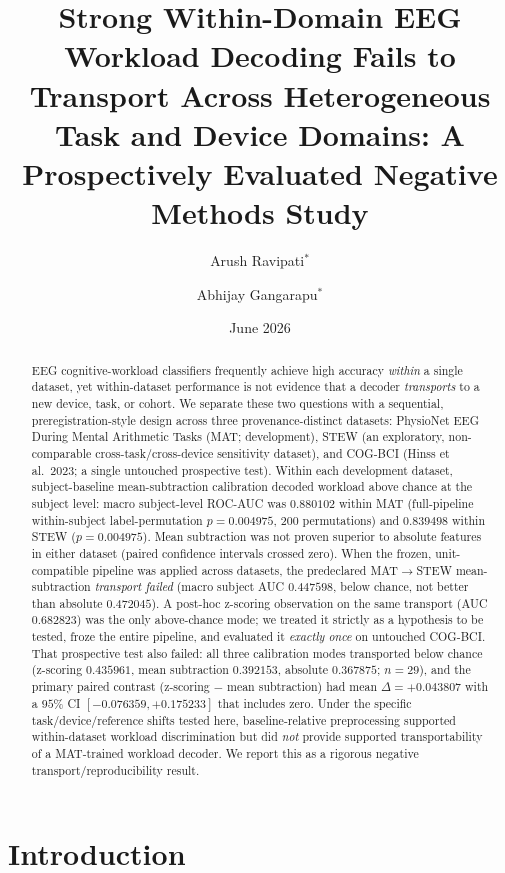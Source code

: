 \documentclass[11pt]{article}
\title{\textbf{Strong Within-Domain EEG Workload Decoding Fails to Transport
Across Heterogeneous Task and Device Domains: A Prospectively Evaluated
Negative Methods Study}}
\author[1]{Arush Ravipati$^{\ast}$}
\author[1]{Abhijay Gangarapu$^{\ast}$}
\affil[1]{Independent Researcher}
\date{June 2026}
\begin{document}
\maketitle
\begingroup
\renewcommand{\thefootnote}{}
\endgroup

\begin{abstract}
EEG cognitive-workload classifiers frequently achieve high accuracy
\textit{within} a single dataset, yet within-dataset performance is not
evidence that a decoder \textit{transports} to a new device, task, or cohort.
We separate these two questions with a sequential, preregistration-style design
across three provenance-distinct datasets: PhysioNet EEG During Mental
Arithmetic Tasks (MAT; development), STEW (an exploratory, non-comparable
cross-task/cross-device sensitivity dataset), and COG-BCI (Hinss et al.\ 2023;
a single untouched prospective test). Within each development dataset,
subject-baseline mean-subtraction calibration decoded workload above chance at
the subject level: macro subject-level ROC-AUC was $0.880102$ within MAT
(full-pipeline within-subject label-permutation $p = 0.004975$, 200
permutations) and $0.839498$ within STEW ($p = 0.004975$). Mean subtraction was
not proven superior to absolute features in either dataset (paired confidence
intervals crossed zero). When the frozen, unit-compatible pipeline was applied
across datasets, the predeclared MAT$\rightarrow$STEW mean-subtraction
\textit{transport failed} (macro subject AUC $0.447598$, below chance, not
better than absolute $0.472045$). A post-hoc z-scoring observation on the same
transport (AUC $0.682823$) was the only above-chance mode; we treated it strictly
as a hypothesis to be tested, froze the entire pipeline, and evaluated it
\textit{exactly once} on untouched COG-BCI. That prospective test also failed:
all three calibration modes transported below chance (z-scoring $0.435961$, mean
subtraction $0.392153$, absolute $0.367875$; $n = 29$), and the primary paired
contrast (z-scoring $-$ mean subtraction) had mean $\Delta = +0.043807$ with a
$95\%$ CI $[-0.076359, +0.175233]$ that includes zero. Under the specific
task/device/reference shifts tested here, baseline-relative preprocessing
supported within-dataset workload discrimination but did \textit{not} provide
supported transportability of a MAT-trained workload decoder. We report this as
a rigorous negative transport/reproducibility result.
\end{abstract}

\section{Introduction}
\end{document}

